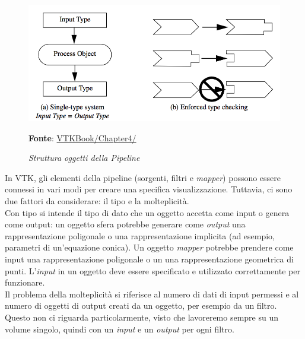 \begin{figure}[h]
    \centering
    \includegraphics[scale=0.35]{immagini/volumerendering/pipeline.png}
    \caption{\textit{Struttura oggetti della Pipeline}}
    \textbf{Fonte}: \href{https://lorensen.github.io/VTKExamples/site/VTKBook/04Chapter4/}{VTKBook/Chapter4/}
    \label{fig: Struttura Pipeline}
\end{figure}

In VTK, gli elementi della pipeline (sorgenti, filtri e \emph{mapper}) possono essere connessi in vari modi per creare una specifica visualizzazione. Tuttavia, ci sono due fattori da considerare: il tipo e la molteplicità.\\
Con tipo si intende il tipo di dato che un oggetto accetta come input o genera come output: un oggetto sfera potrebbe generare come \emph{output} una rappresentazione poligonale o una rappresentazione implicita (ad esempio, parametri di un'equazione conica). Un oggetto \emph{mapper} potrebbe prendere come input una rappresentazione poligonale o un una rappresentazione geometrica di punti. L'\emph{input} in un oggetto deve essere specificato e utilizzato correttamente per funzionare.
\\
Il problema della molteplicità si riferisce al numero di dati di input permessi e al numero di oggetti di output creati da un oggetto, per esempio da un filtro. Questo non ci riguarda particolarmente, visto che lavoreremo sempre su un volume singolo, quindi con un \emph{input} e un \emph{output} per ogni filtro.

